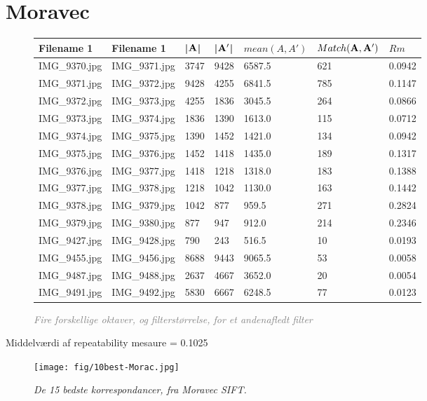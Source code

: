 \section{Moravec}
\begin{figure}[H]
    \centering
    \begin{center}    
    \begin{tabular}{ | l | l | l | l | l | l | l |}
    \hline
    Filename 1 & Filename 1 & |$\bold{A}$| & |$\bold{A'}$| & $mean(A,A')$ & $Match(\bold{A}, \bold{A}')$ & $Rm$ \\ \hline
IMG\_9370.jpg &	IMG\_9371.jpg &	3747 &	9428 &	6587.5 &	621 &	0.0942\\ \hline
IMG\_9371.jpg &	IMG\_9372.jpg &	9428 &	4255 &	6841.5 &	785 &	0.1147\\ \hline
IMG\_9372.jpg &	IMG\_9373.jpg &	4255 &	1836 &	3045.5 &	264 &	0.0866\\ \hline
IMG\_9373.jpg &	IMG\_9374.jpg &	1836 &	1390 &	1613.0 &	115 &	0.0712\\ \hline
IMG\_9374.jpg &	IMG\_9375.jpg &	1390 &	1452 &	1421.0 &	134 &	0.0942\\ \hline
IMG\_9375.jpg &	IMG\_9376.jpg &	1452 &	1418 &	1435.0 &	189 &	0.1317\\ \hline
IMG\_9376.jpg &	IMG\_9377.jpg &	1418 &	1218 &	1318.0 &	183 &	0.1388\\ \hline
IMG\_9377.jpg &	IMG\_9378.jpg &	1218 &	1042 &	1130.0 &	163 &	0.1442\\ \hline
IMG\_9378.jpg &	IMG\_9379.jpg &	1042 &	877 &	959.5 &	271 	&	0.2824\\ \hline
IMG\_9379.jpg &	IMG\_9380.jpg &	877 &	947 &	912.0 &	214 	&	0.2346\\ \hline
IMG\_9427.jpg &	IMG\_9428.jpg &	790 &	243 &	516.5 &	10 		&	0.0193\\ \hline
IMG\_9455.jpg &	IMG\_9456.jpg &	8688 &	9443 &	9065.5 &	53 &	0.0058\\ \hline
IMG\_9487.jpg &	IMG\_9488.jpg &	2637 &	4667 &	3652.0 &	20 &	0.0054\\ \hline
IMG\_9491.jpg &	IMG\_9492.jpg &	5830 &	6667 &	6248.5 &	77 &	0.0123\\ \hline
    \end{tabular}       
    \caption{\textcolor{gray}{\footnotesize \textit{Fire forskellige oktaver, og filterstørrelse, for et andenafledt filter}}}
    \label{tab:HARRISOCTAVE2}
     \end{center}
     \vspace{-2.5em}
\end{figure} \noindent
Middelværdi af repeatability mesaure  = 0.1025
\begin{figure}[H]
    \centering
    \texttt{[image: fig/10best-Morac.jpg]}
    \vspace{-0.5em}   
    \begin{center}
    \caption{{\footnotesize \textit{ De 15 bedste korrespondancer, fra Moravec SIFT.}}}
    \label{fig:harsift}
     \end{center}
  \end{figure}
       \vspace{-2.7em}
\noindent


